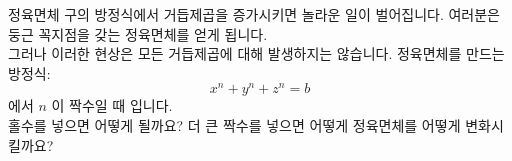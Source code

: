 \begin{surferPage}{정육면체}
구의 방정식에서 거듭제곱을 증가시키면 놀라운 일이 벌어집니다. 여러분은 둥근 꼭지점을 갖는 정육면체를 얻게 됩니다.\\
\vspace{0.3cm}
그러나 이러한 현상은 모든 거듭제곱에 대해 발생하지는 않습니다. 정육면체를 만드는 방정식:
\[x^n+y^n+z^n=b\]
에서 $n$ 이 짝수일 때 입니다.\\
\vspace{0.3cm}
홀수를 넣으면 어떻게 될까요? 더 큰 짝수를 넣으면 어떻게 정육면체를 어떻게 변화시킬까요?
\end{surferPage}
